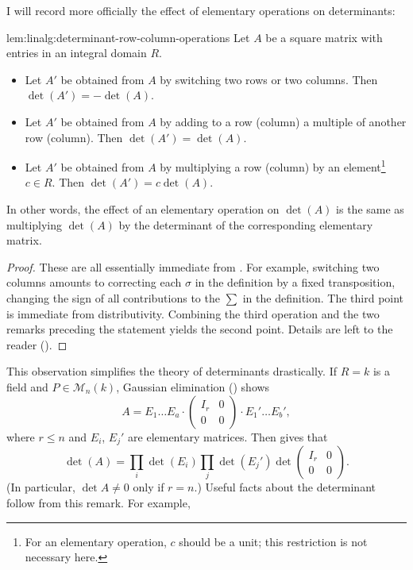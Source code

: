 I will record more officially the effect of elementary operations on
determinants:
\begin{lem}{}{lem:linalg:determinant-row-column-operations}
  Let $A$ be a square matrix with entries in an integral domain $R$.
  \begin{itemize}
  \item Let $A'$ be obtained from $A$ by switching two rows or two
    columns. Then $\det(A') = -\det(A)$.
  \item Let $A'$ be obtained from $A$ by adding to a row (column) a
    multiple of another row (column). Then $\det(A') = \det(A)$.
  \item Let $A'$ be obtained from $A$ by multiplying a row (column) by
    an element\footnote{For an elementary operation, $c$ should be a
      unit; this restriction is not necessary here.} $c \in R$. Then
    $\det(A') = c\det(A)$.
  \end{itemize}
  In other words, the effect of an elementary operation on $\det(A)$
  is the same as multiplying $\det(A)$ by the determinant of the
  corresponding elementary matrix.
\end{lem}
\begin{proof}
  These are all essentially immediate from . For
  example, switching two columns amounts to correcting each $\sigma$
  in the definition by a fixed transposition, changing the sign of all
  contributions to the $\sum$ in the definition. The third point is
  immediate from distributivity. Combining the third operation and the
  two remarks preceding the statement yields the second point. Details
  are left to the reader
  ().
\end{proof}

This observation simplifies the theory of determinants drastically. If
$R = k$ is a field and $P \in \mathcal{M}_n(k)$, Gaussian elimination
() shows
\[
  A = E_1 \dots E_a \cdot \left(
    \begin{array}{c|c}
      I_r & 0 \\
      \hline
      0 & 0
    \end{array}
  \right) \cdot E_1' \dots E_b',
\]
where $r \leq n$ and $E_i$, $E_j'$ are elementary matrices. Then
 gives that
\[
  \det(A) = \prod_i \det(E_i) \prod_j \det(E_j') \det \left(
    \begin{array}{c|c}
      I_r & 0 \\
      \hline
      0 & 0
    \end{array}
  \right).
\]
(In particular, $\det A \neq 0$ only if $r = n$.) Useful facts about
the determinant follow from this remark. For example,

